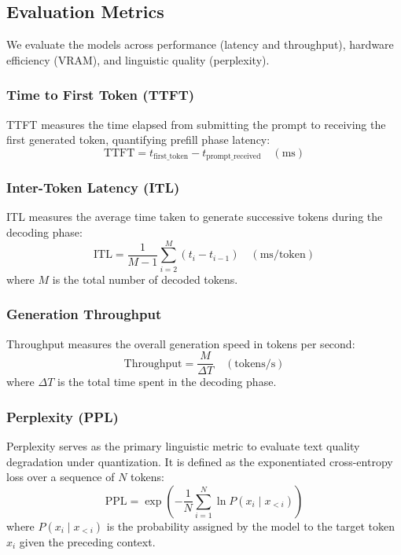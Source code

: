 \subsection{Evaluation Metrics}

We evaluate the models across performance (latency and throughput), hardware efficiency (VRAM), and linguistic quality (perplexity).

\subsubsection{Time to First Token (TTFT)}
TTFT measures the time elapsed from submitting the prompt to receiving the first generated token, quantifying prefill phase latency:
\begin{equation}
\text{TTFT} = t_{\text{first\_token}} - t_{\text{prompt\_received}} \quad (\text{ms})
\end{equation}

\subsubsection{Inter-Token Latency (ITL)}
ITL measures the average time taken to generate successive tokens during the decoding phase:
\begin{equation}
\text{ITL} = \frac{1}{M - 1} \sum_{i=2}^{M} (t_i - t_{i-1}) \quad (\text{ms/token})
\end{equation}
where $M$ is the total number of decoded tokens.

\subsubsection{Generation Throughput}
Throughput measures the overall generation speed in tokens per second:
\begin{equation}
\text{Throughput} = \frac{M}{\Delta T} \quad (\text{tokens/s})
\end{equation}
where $\Delta T$ is the total time spent in the decoding phase.

\subsubsection{Perplexity (PPL)}
Perplexity serves as the primary linguistic metric to evaluate text quality degradation under quantization. It is defined as the exponentiated cross-entropy loss over a sequence of $N$ tokens:
\begin{equation}
\text{PPL} = \exp\left(-\frac{1}{N} \sum_{i=1}^{N} \ln P(x_i \mid x_{<i})\right)
\end{equation}
where $P(x_i \mid x_{<i})$ is the probability assigned by the model to the target token $x_i$ given the preceding context.

